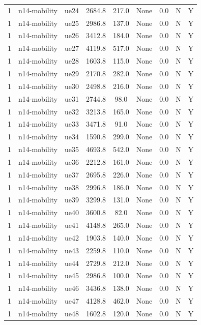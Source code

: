 \begin{table}[ht]
\begin{tabular}{|c|c|c|c|c|c|c|c|c|}
1 & n14-mobility & ue24 & 2684.8 & 217.0 & None & 0.0 & N & Y \\
1 & n14-mobility & ue25 & 2986.8 & 137.0 & None & 0.0 & N & Y \\
1 & n14-mobility & ue26 & 3412.8 & 184.0 & None & 0.0 & N & Y \\
1 & n14-mobility & ue27 & 4119.8 & 517.0 & None & 0.0 & N & Y \\
1 & n14-mobility & ue28 & 1603.8 & 115.0 & None & 0.0 & N & Y \\
1 & n14-mobility & ue29 & 2170.8 & 282.0 & None & 0.0 & N & Y \\
1 & n14-mobility & ue30 & 2498.8 & 216.0 & None & 0.0 & N & Y \\
1 & n14-mobility & ue31 & 2744.8 & 98.0 & None & 0.0 & N & Y \\
1 & n14-mobility & ue32 & 3213.8 & 165.0 & None & 0.0 & N & Y \\
1 & n14-mobility & ue33 & 3471.8 & 91.0 & None & 0.0 & N & Y \\
1 & n14-mobility & ue34 & 1590.8 & 299.0 & None & 0.0 & N & Y \\
1 & n14-mobility & ue35 & 4693.8 & 542.0 & None & 0.0 & N & Y \\
1 & n14-mobility & ue36 & 2212.8 & 161.0 & None & 0.0 & N & Y \\
1 & n14-mobility & ue37 & 2695.8 & 226.0 & None & 0.0 & N & Y \\
1 & n14-mobility & ue38 & 2996.8 & 186.0 & None & 0.0 & N & Y \\
1 & n14-mobility & ue39 & 3299.8 & 131.0 & None & 0.0 & N & Y \\
1 & n14-mobility & ue40 & 3600.8 & 82.0 & None & 0.0 & N & Y \\
1 & n14-mobility & ue41 & 4148.8 & 265.0 & None & 0.0 & N & Y \\
1 & n14-mobility & ue42 & 1903.8 & 140.0 & None & 0.0 & N & Y \\
1 & n14-mobility & ue43 & 2259.8 & 110.0 & None & 0.0 & N & Y \\
1 & n14-mobility & ue44 & 2729.8 & 212.0 & None & 0.0 & N & Y \\
1 & n14-mobility & ue45 & 2986.8 & 100.0 & None & 0.0 & N & Y \\
1 & n14-mobility & ue46 & 3436.8 & 138.0 & None & 0.0 & N & Y \\
1 & n14-mobility & ue47 & 4128.8 & 462.0 & None & 0.0 & N & Y \\
1 & n14-mobility & ue48 & 1602.8 & 120.0 & None & 0.0 & N & Y \\

\end{tabular}
\end{table}
